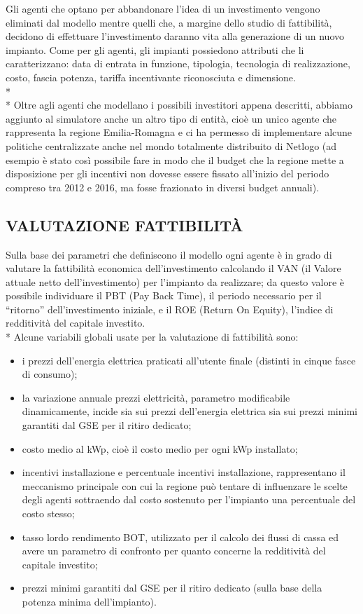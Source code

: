 \documentclass[12pt,a4paper,openright,twoside]{report}
\begin{document}
Gli agenti che optano per abbandonare l'idea di un investimento vengono eliminati dal modello mentre quelli che, a margine dello studio di fattibilità, decidono di effettuare l'investimento daranno vita alla generazione di un nuovo impianto. Come per gli agenti, gli impianti possiedono attributi che li caratterizzano: data di entrata in funzione, tipologia, tecnologia di realizzazione, costo, fascia potenza, tariffa incentivante riconosciuta e dimensione.\\* \\*
Oltre agli agenti che modellano i possibili investitori appena descritti, abbiamo aggiunto al simulatore anche un altro tipo di entità, cioè un unico agente che rappresenta la regione Emilia-Romagna e ci ha permesso di implementare alcune politiche centralizzate anche nel mondo totalmente distribuito di Netlogo (ad esempio è stato così possibile fare in modo che il budget che la regione mette a disposizione per gli incentivi non dovesse essere fissato all'inizio del periodo compreso tra 2012 e 2016, ma fosse frazionato in diversi budget annuali).

\subsection{VALUTAZIONE FATTIBILITÀ}
Sulla base dei parametri che definiscono il modello ogni agente è in grado di valutare la fattibilità economica dell'investimento calcolando il VAN (il Valore attuale netto dell'investimento) per l'impianto da realizzare; da questo valore è possibile individuare il PBT (Pay Back Time), il periodo necessario per il ``ritorno'' dell'investimento iniziale, e il ROE (Return On Equity), l'indice di redditività del capitale investito.
\\*
Alcune variabili globali usate per la valutazione di fattibilità sono:
\begin{itemize}
\item i prezzi dell'energia elettrica praticati all'utente finale (distinti in cinque fasce di consumo);
\item la variazione annuale prezzi elettricità, parametro modificabile dinamicamente, incide sia sui prezzi dell'energia elettrica sia sui prezzi minimi garantiti dal GSE per il ritiro dedicato;
\item costo medio al kWp, cioè il costo medio per ogni kWp installato;
\item incentivi installazione e percentuale incentivi installazione, rappresentano il meccanismo principale con cui la regione può tentare di influenzare le scelte degli agenti sottraendo dal costo sostenuto per l'impianto una percentuale del costo stesso;
\item tasso lordo rendimento BOT, utilizzato per il calcolo dei flussi di cassa ed avere un parametro di confronto per quanto concerne la redditività del capitale investito;
\item prezzi minimi garantiti dal GSE per il ritiro dedicato (sulla base della potenza minima dell'impianto).
\end{itemize}
\end{document}
